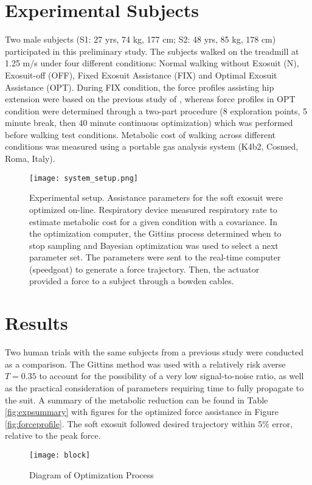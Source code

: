\section{Experimental Subjects}
Two male subjects (S1: 27 yrs, 74 kg, 177 cm; S2: 48 yrs, 85 kg, 178 cm) participated in this preliminary study. The subjects walked on the treadmill at 1.25 m/s under four different conditions: Normal walking without Exosuit (N), Exosuit-off (OFF), Fixed Exosuit Assistance (FIX) and Optimal Exosuit Assistance (OPT). During FIX condition, the force profiles assisting hip extension were based on the previous study of \citep{Ding2016}, whereas force profiles in OPT condition were determined through a two-part procedure (8 exploration points, 5 minute break, then 40 minute continuous optimization) which was performed before walking test conditions. Metabolic cost of walking across different conditions was measured using a portable gas analysis system (K4b2, Cosmed, Roma, Italy).

\begin{figure}[t]
\centering
\texttt{[image: system\_setup.png]}
\caption{Experimental setup. Assistance parameters for the soft exosuit were optimized on-line. Respiratory device measured respiratory rate to estimate metabolic cost for a given condition with a covariance. In the optimization computer, the Gittins process determined when to stop sampling and Bayesian optimization was used to select a next parameter set. The parameters were sent to the real-time computer (speedgoat) to generate a force trajectory. Then, the actuator provided a force to a subject through a bowden cables. }
\label{fig:expsetup}
\end{figure}

\section{Results}
Two human trials with the same subjects from a previous study were conducted as a comparison. The Gittins method was used with a relatively risk averse $T=0.35$ to account for the possibility of a very low signal-to-noise ratio, as well as the practical consideration of parameters requiring time to fully propagate to the suit. A summary of the metabolic reduction can be found in Table \ref{fig:expsummary} with figures for the optimized force assistance in Figure \ref{fig:forceprofile}. The soft exosuit followed desired trajectory within 5\% error, relative to the peak force.

\begin{figure}[t]
\centering
\texttt{[image: block]}
\caption{Diagram of Optimization Process}
\label{fig:block}
\end{figure}


